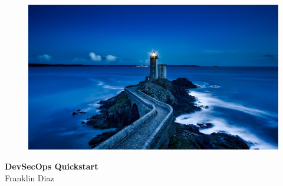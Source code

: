 \begin{titlepage}
    \centering
        \vspace{0mm}
            \begin{figure}[!h]
                \centering
                \includegraphics[scale=1.0]{images/plouzane-1758197_1920.jpg}
            \end{figure}
        \vspace*{40mm} %
        \begin{flushright}
            \textbf{\textsf{\Huge {DevSecOps Quickstart}}}\\
            \vspace{5mm}
            \Large \textsf{Franklin Diaz}\\
            \vspace*{0mm}
        \end{flushright}
	\clearpage
		\vspace*{\fill}

\end{titlepage}

